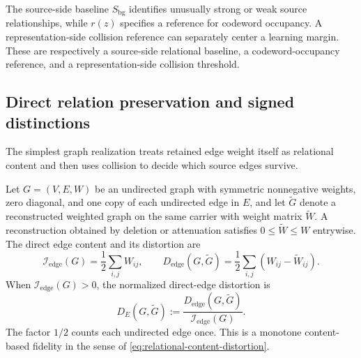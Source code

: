 The source-side baseline $S_{\mathrm{bg}}$ identifies unusually strong or weak source relationships, while $r(z)$ specifies a reference for codeword occupancy.
A representation-side collision reference can separately center a learning margin.
These are respectively a source-side relational baseline, a codeword-occupancy reference, and a representation-side collision threshold.

\subsection{Direct relation preservation and signed distinctions}
\label{sec:edge-cut-distortion}

The simplest graph realization treats retained edge weight itself as relational content and then uses collision to decide which source edges survive.

Let $G=(V,E,W)$ be an undirected graph with symmetric nonnegative weights, zero diagonal, and one copy of each undirected edge in $E$, and let $\widetilde G$ denote a reconstructed weighted graph on the same carrier with weight matrix $\widetilde W$.
A reconstruction obtained by deletion or attenuation satisfies $0\le\widetilde W\le W$ entrywise.
The direct edge content and its distortion are
\begin{equation}
\mathcal I_{\mathrm{edge}}(G)=\frac12\sum_{i,j}W_{ij},\qquad
D_{\mathrm{edge}}(G,\widetilde G)=\frac12\sum_{i,j}(W_{ij}-\widetilde W_{ij}).
\label{eq:edge-distortion}
\end{equation}
When $\mathcal I_{\mathrm{edge}}(G)>0$, the normalized direct-edge distortion is
\begin{equation}
D_E(G,\widetilde G)
:=\frac{D_{\mathrm{edge}}(G,\widetilde G)}{\mathcal I_{\mathrm{edge}}(G)}.
\label{eq:normalized-edge-distortion}
\end{equation}
The factor $1/2$ counts each undirected edge once.
This is a monotone content-based fidelity in the sense of \cref{eq:relational-content-distortion}.

